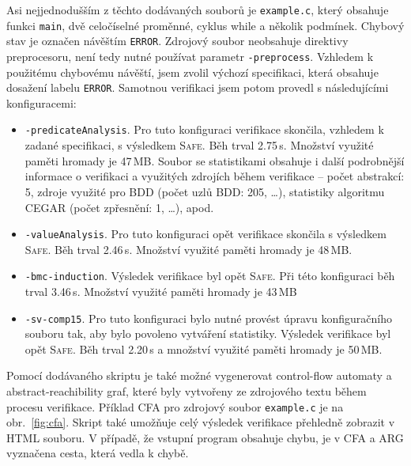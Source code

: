 \documentclass[a4paper,12pt]{article}
\begin{document}
Asi nejjednodušším
z těchto dodávaných souborů je \texttt{example.c}, který obsahuje funkci \texttt{main}, dvě celočíselné proměnné, cyklus while a několik podmínek. Chybový 
stav je označen návěštím \texttt{ERROR}. Zdrojový soubor neobsahuje direktivy preprocesoru, není tedy nutné používat parametr \texttt{-preprocess}. 
Vzhledem k použitému chybovému návěští, jsem zvolil výchozí specifikaci, která obsahuje dosažení labelu \texttt{ERROR}. 
Samotnou verifikaci jsem potom provedl s následujícími konfiguracemi:
\begin{itemize}
 \item \texttt{-predicateAnalysis}. Pro tuto konfiguraci verifikace skončila, vzhledem k zadané specifikaci, s výsledkem \textsc{Safe}.
 Běh trval 2.75\,s. Množství využité paměti hromady je 47\,MB. Soubor se statistikami obsahuje i další podrobnější informace
 o verifikaci a využitých zdrojích během verifikace -- počet abstrakcí: 5, zdroje využité pro BDD (počet uzlů BDD: 205, \dots), statistiky algoritmu 
 CEGAR (počet zpřesnění: 1, \dots), apod.
 
 \item \texttt{-valueAnalysis}. Pro tuto konfiguraci opět verifikace skončila s výsledkem \textsc{Safe}. Běh trval 2.46\,s. Množství využité 
 paměti hromady je 48\,MB.
 
 \item \texttt{-bmc-induction}. Výsledek verifikace byl opět \textsc{Safe}. Při této konfiguraci běh trval 3.46\,s.
 Množství využité paměti hromady je 43\,MB
 
 \item \texttt{-sv-comp15}. Pro tuto konfiguraci bylo nutné provést úpravu konfiguračního souboru tak, aby bylo povoleno 
 vytváření statistiky. Výsledek verifikace byl opět \textsc{Safe}. Běh trval 2.20\,s a množství využité paměti hromady
 je 50\,MB.
\end{itemize}
Pomocí dodávaného skriptu je také možné vygenerovat control-flow automaty a abstract-reachibility graf, které byly vytvořeny 
ze zdrojového textu během procesu verifikace. Příklad CFA pro zdrojový soubor \texttt{example.c} je na obr.~\ref{fig:cfa}. Skript také 
umožňuje celý výsledek verifikace přehledně zobrazit v HTML souboru. V případě, že vstupní 
program obsahuje chybu, je v CFA a ARG vyznačena cesta, která vedla k chybě.
\end{document}
